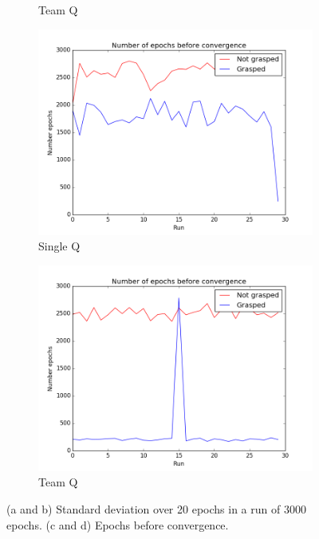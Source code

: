 \begin{figure}
\begin{subfigure}{0.48\textwidth}
		\caption{Team Q}
		\label{3b}		
	\end{subfigure}
	\begin{subfigure}{.48\textwidth}
		\includegraphics[width=\textwidth]{images/Convergence_single.png}
		\caption{Single Q}
		\label{3c}		
	\end{subfigure}
	\begin{subfigure}{0.48\textwidth}
		\includegraphics[width=\textwidth]{images/Convergence_team.png}
		\caption{Team Q}
		\label{3d}		
	\end{subfigure}
	\caption{(a and b) Standard deviation over 20 epochs in a run of 3000 epochs. (c and d) Epochs before convergence.}
	\label{fig:Results3}
\end{figure}


